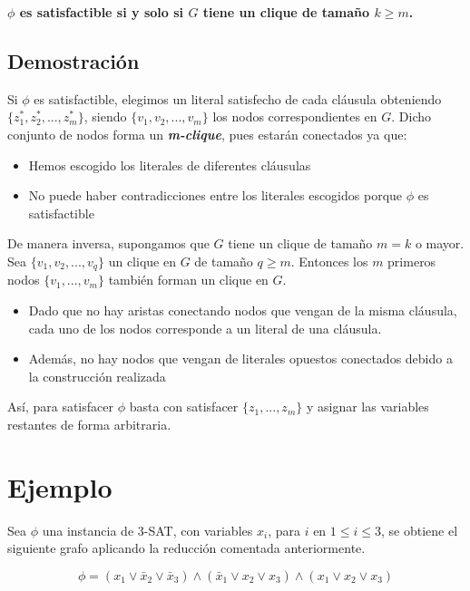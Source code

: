 \documentclass{article}
\begin{document}
\centerline{\textbf{ $\phi$ es satisfactible si y solo si $G$ tiene un clique de tamaño $k \geq m$.}}

\subsection{Demostración}
Si $\phi$ es satisfactible, elegimos un literal satisfecho de cada cláusula obteniendo $\{z_{1}^{*}, z_{2}^{*}, ..., z_{m}^{*}\}$, siendo $\{v_{1}, v_{2}, ..., v_{m}\}$ los nodos correspondientes en $G$. Dicho conjunto de nodos forma un \textit{\textbf{m-clique}}, pues estarán conectados ya que:
\begin{itemize}
    \item Hemos escogido los literales de diferentes cláusulas
    \item No puede haber contradicciones entre los literales escogidos porque $\phi$ es satisfactible
\end{itemize}

De manera inversa, supongamos que $G$ tiene un clique de tamaño $m = k$ o mayor. Sea $\{v_{1}, v_{2}, ..., v_{q}\}$ un clique en $G$ de tamaño $q \geq m$. Entonces los $m$ primeros nodos $\{v_{1}, ..., v_{m}\}$ también forman un clique en $G$.
\begin{itemize}
    \item Dado que no hay aristas conectando nodos que vengan de la misma cláusula, cada uno de los nodos corresponde a un literal de una cláusula.
    \item Además, no hay nodos que vengan de literales opuestos conectados debido a la construcción realizada
\end{itemize}
Así, para satisfacer $\phi$ basta con satisfacer $\{z_{1}, ..., z_{m}\}$ y asignar las variables restantes de forma arbitraria.
\section{Ejemplo}
Sea $\phi$ una instancia de 3-SAT, con variables $x_{i}$, para $i$ en $1 \leq i \leq 3$, se obtiene el siguiente grafo aplicando la reducción comentada anteriormente. 

$$\phi = (x_{1}\lor \bar{x}_{2} \lor \bar{x}_{3}) \land (\bar{x}_{1} \lor x_{2} \lor x_{3}) \land (x_{1} \lor x_{2} \lor x_{3})$$
\end{document}
